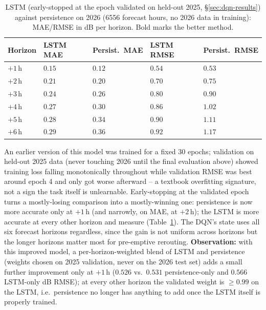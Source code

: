 \documentclass[]{ieeeaccess}
\begin{document}
\begin{table}[t]
\centering
\caption{LSTM (early-stopped at the epoch validated on held-out 2025, \S\ref{sec:dqn-results}) against persistence on 2026 (6556 forecast hours, no 2026 data in training): MAE/RMSE in dB per horizon. Bold marks the better method.}
\label{tab:lstm-2026}
{\scriptsize\setlength{\tabcolsep}{3pt}
\begin{tabularx}{\columnwidth}{|>{\centering\arraybackslash}X|>{\centering\arraybackslash}X|>{\centering\arraybackslash}X|>{\centering\arraybackslash}X|>{\centering\arraybackslash}X|}
\hline
\textbf{Horizon} & \textbf{LSTM MAE} & \textbf{Persist.\ MAE} & \textbf{LSTM RMSE} & \textbf{Persist.\ RMSE} \\
\hline
$+1$\,h & $0.15$ & $\mathbf{0.12}$ & $0.54$ & $\mathbf{0.53}$ \\
\hline
$+2$\,h & $0.21$ & $\mathbf{0.20}$ & $\mathbf{0.70}$ & $0.75$ \\
\hline
$+3$\,h & $\mathbf{0.24}$ & $0.26$ & $\mathbf{0.80}$ & $0.90$ \\
\hline
$+4$\,h & $\mathbf{0.27}$ & $0.30$ & $\mathbf{0.86}$ & $1.02$ \\
\hline
$+5$\,h & $\mathbf{0.28}$ & $0.34$ & $\mathbf{0.90}$ & $1.11$ \\
\hline
$+6$\,h & $\mathbf{0.29}$ & $0.36$ & $\mathbf{0.92}$ & $1.17$ \\
\hline
\end{tabularx}}
\end{table}

An earlier version of this model was trained for a fixed 30 epochs; validation on held-out 2025 data (never touching 2026 until the final evaluation above) showed training loss falling monotonically throughout while validation RMSE was best around epoch 4 and only got worse afterward -- a textbook overfitting signature, not a sign the task itself is unlearnable. Early-stopping at the validated epoch turns a mostly-losing comparison into a mostly-winning one: persistence is now more accurate only at $+1$\,h (and narrowly, on MAE, at $+2$\,h); the LSTM is more accurate at every other horizon and measure (Table~\ref{tab:lstm-2026}). The DQN's state uses all six forecast horizons regardless, since the gain is not uniform across horizons but the longer horizons matter most for pre-emptive rerouting. \textbf{Observation:} with this improved model, a per-horizon-weighted blend of LSTM and persistence (weights chosen on 2025 validation, never on the 2026 test set) adds a small further improvement only at $+1$\,h ($0.526$ vs.\ $0.531$ persistence-only and $0.566$ LSTM-only dB RMSE); at every other horizon the validated weight is $\ge0.99$ on the LSTM, i.e.\ persistence no longer has anything to add once the LSTM itself is properly trained.
\end{document}
